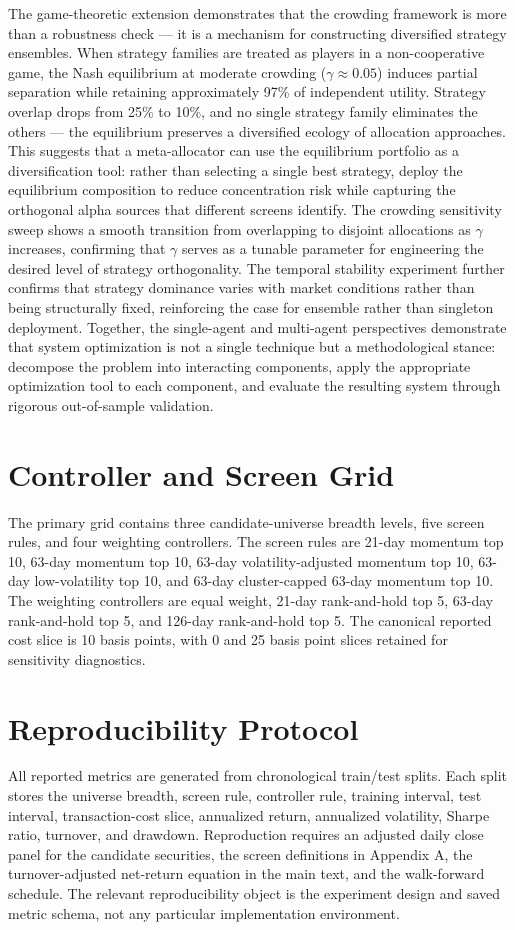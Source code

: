 \documentclass[journal,10pt]{IEEEtran}
\begin{document}
The game-theoretic extension demonstrates that the crowding framework is more than a robustness check — it is a mechanism for constructing diversified strategy ensembles. When strategy families are treated as players in a non-cooperative game, the Nash equilibrium at moderate crowding ($\gamma\approx0.05$) induces partial separation while retaining approximately 97\% of independent utility. Strategy overlap drops from 25\% to 10\%, and no single strategy family eliminates the others — the equilibrium preserves a diversified ecology of allocation approaches. This suggests that a meta-allocator can use the equilibrium portfolio as a diversification tool: rather than selecting a single best strategy, deploy the equilibrium composition to reduce concentration risk while capturing the orthogonal alpha sources that different screens identify. The crowding sensitivity sweep shows a smooth transition from overlapping to disjoint allocations as $\gamma$ increases, confirming that $\gamma$ serves as a tunable parameter for engineering the desired level of strategy orthogonality. The temporal stability experiment further confirms that strategy dominance varies with market conditions rather than being structurally fixed, reinforcing the case for ensemble rather than singleton deployment. Together, the single-agent and multi-agent perspectives demonstrate that system optimization is not a single technique but a methodological stance: decompose the problem into interacting components, apply the appropriate optimization tool to each component, and evaluate the resulting system through rigorous out-of-sample validation.



\appendices
\section{Controller and Screen Grid}
The primary grid contains three candidate-universe breadth levels, five screen rules, and four weighting controllers. The screen rules are 21-day momentum top 10, 63-day momentum top 10, 63-day volatility-adjusted momentum top 10, 63-day low-volatility top 10, and 63-day cluster-capped 63-day momentum top 10. The weighting controllers are equal weight, 21-day rank-and-hold top 5, 63-day rank-and-hold top 5, and 126-day rank-and-hold top 5. The canonical reported cost slice is 10 basis points, with 0 and 25 basis point slices retained for sensitivity diagnostics.

\section{Reproducibility Protocol}
All reported metrics are generated from chronological train/test splits. Each split stores the universe breadth, screen rule, controller rule, training interval, test interval, transaction-cost slice, annualized return, annualized volatility, Sharpe ratio, turnover, and drawdown. Reproduction requires an adjusted daily close panel for the candidate securities, the screen definitions in Appendix A, the turnover-adjusted net-return equation in the main text, and the walk-forward schedule. The relevant reproducibility object is the experiment design and saved metric schema, not any particular implementation environment.
\end{document}
